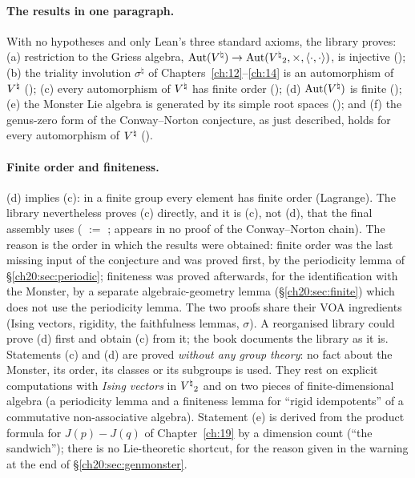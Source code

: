 \paragraph{The results in one paragraph.}  With no hypotheses and only Lean's three standard axioms, the library
proves: (a) restriction to the Griess algebra, $\operatorname{Aut}({V^{\natural}})\to\operatorname{Aut}({V^{\natural}}_2,\times,\langle\cdot,\cdot\rangle)$, is
injective (); (b) the triality involution $\sigma^\natural$ of
Chapters~\ref{ch:12}--\ref{ch:14} is an automorphism of ${V^{\natural}}$ (); (c) every automorphism of ${V^{\natural}}$
has finite order (); (d) $\operatorname{Aut}({V^{\natural}})$ is finite (); (e) the
Monster Lie algebra is generated by its simple root spaces (); and (f) the
genus-zero form of the Conway--Norton conjecture, as just described, holds for every automorphism of ${V^{\natural}}$
().

\paragraph{Finite order and finiteness.}  (d) implies (c): in a finite group every element has finite order (Lagrange).
The library nevertheless proves (c) directly, and it is (c), not (d), that the final assembly uses
( $:=$  ;
 appears in no proof of the Conway--Norton chain).  The reason is the order in which the results were
obtained: finite order was the last missing input of the conjecture and was proved first, by the periodicity lemma of
\S\ref{ch20:sec:periodic}; finiteness was proved afterwards, for the identification with the Monster, by a separate
algebraic-geometry lemma (\S\ref{ch20:sec:finite}) which does not use the periodicity lemma.  The two proofs share their
VOA ingredients (Ising vectors, rigidity, the faithfulness lemmas, $\sigma$).  A reorganised library could prove (d) first and
obtain (c) from it; the book documents the library as it is.
Statements (c) and (d) are proved \emph{without any group theory}: no fact about the Monster, its order, its
classes or its subgroups is used.  They rest on explicit computations with \emph{Ising vectors} in ${V^{\natural}}_2$ and on
two pieces of finite-dimensional algebra (a periodicity lemma and a finiteness lemma for ``rigid idempotents'' of a
commutative non-associative algebra).  Statement (e) is derived from the product formula for $J(p)-J(q)$ of
Chapter~\ref{ch:19} by a dimension count (``the sandwich''); there is no Lie-theoretic shortcut, for the reason given in
the warning at the end of \S\ref{ch20:sec:genmonster}.

